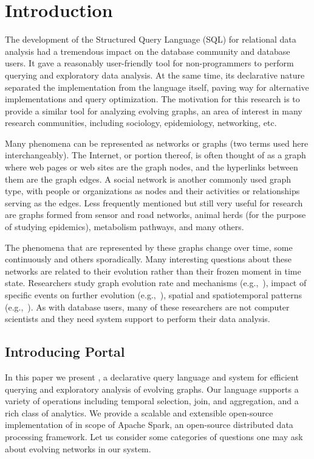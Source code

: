 \section{Introduction}
\label{sec:intro}

The development of the Structured Query Language (SQL) for relational
data analysis had a tremendous impact on the database community and
database users.  It gave a reasonably user-friendly tool for
non-programmers to perform querying and exploratory data analysis.
At the same time, its declarative nature separated the implementation
from the language itself, paving way for alternative implementations
and query optimization.  The motivation for this research is to
provide a similar tool for analyzing evolving graphs, an area of
interest in many research communities, including sociology,
epidemiology, networking, etc.

Many phenomena can be represented as networks or graphs (two terms
used here interchangeably).  The Internet, or portion thereof, is
often thought of as a graph where web pages or web sites are the graph
nodes, and the hyperlinks between them are the graph edges.  A social
network is another commonly used graph type, with people or
organizations as nodes and their activities or relationships serving
as the edges.  Less frequently mentioned but still very useful for
research are graphs formed from sensor and road networks, animal herds
(for the purpose of studying epidemics), metabolism pathways, and many
others.

The phenomena that are represented by these graphs change over time,
some continuously and others sporadically.  Many interesting questions
about these networks are related to their evolution rather than their
frozen moment in time state.  Researchers study graph evolution rate
and mechanisms (e.g.,~\cite{Cho2000,DBLP:journals/csur/AggarwalS14}),
impact of specific events on further evolution
(e.g.,~\cite{Chan2008}), spatial and spatiotemporal patterns
(e.g.,~\cite{Lahiri2008}).  As with database users, many of these
researchers are not computer scientists and they need system support
to perform their data analysis.

\subsection{Introducing Portal}

In this paper we present \ql, a declarative query language and system
for efficient querying and exploratory analysis of evolving graphs.
Our language supports a variety of operations including temporal
selection, join, and aggregation, and a rich class of analytics.  We
provide a scalable and extensible open-source implementation of \ql in
scope of Apache Spark, an open-source distributed data processing
framework.  Let us consider some categories of questions one may ask
about evolving networks in our system.

